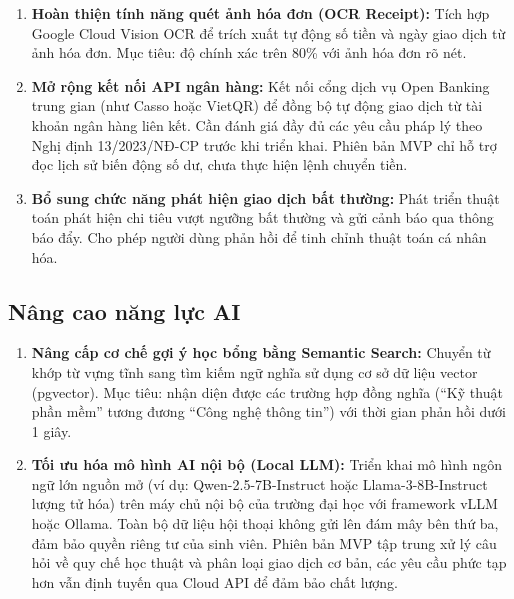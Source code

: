 \begin{enumerate}
    \item \textbf{Hoàn thiện tính năng quét ảnh hóa đơn (OCR Receipt):} Tích hợp Google Cloud Vision OCR để trích xuất tự động số tiền và ngày giao dịch từ ảnh hóa đơn. Mục tiêu: độ chính xác trên 80\% với ảnh hóa đơn rõ nét.

    \item \textbf{Mở rộng kết nối API ngân hàng:} Kết nối cổng dịch vụ Open Banking trung gian (như Casso hoặc VietQR) để đồng bộ tự động giao dịch từ tài khoản ngân hàng liên kết. Cần đánh giá đầy đủ các yêu cầu pháp lý theo Nghị định 13/2023/NĐ-CP trước khi triển khai. Phiên bản MVP chỉ hỗ trợ đọc lịch sử biến động số dư, chưa thực hiện lệnh chuyển tiền.

    \item \textbf{Bổ sung chức năng phát hiện giao dịch bất thường:} Phát triển thuật toán phát hiện chi tiêu vượt ngưỡng bất thường và gửi cảnh báo qua thông báo đẩy. Cho phép người dùng phản hồi để tinh chỉnh thuật toán cá nhân hóa.
\end{enumerate}

\subsection{Nâng cao năng lực AI}

\begin{enumerate}
    \item \textbf{Nâng cấp cơ chế gợi ý học bổng bằng Semantic Search:} Chuyển từ khớp từ vựng tĩnh sang tìm kiếm ngữ nghĩa sử dụng cơ sở dữ liệu vector (pgvector). Mục tiêu: nhận diện được các trường hợp đồng nghĩa (``Kỹ thuật phần mềm'' tương đương ``Công nghệ thông tin'') với thời gian phản hồi dưới 1 giây.

    \item \textbf{Tối ưu hóa mô hình AI nội bộ (Local LLM):} Triển khai mô hình ngôn ngữ lớn nguồn mở (ví dụ: Qwen-2.5-7B-Instruct hoặc Llama-3-8B-Instruct lượng tử hóa) trên máy chủ nội bộ của trường đại học với framework vLLM hoặc Ollama. Toàn bộ dữ liệu hội thoại không gửi lên đám mây bên thứ ba, đảm bảo quyền riêng tư của sinh viên. Phiên bản MVP tập trung xử lý câu hỏi về quy chế học thuật và phân loại giao dịch cơ bản, các yêu cầu phức tạp hơn vẫn định tuyến qua Cloud API để đảm bảo chất lượng.
\end{enumerate}
